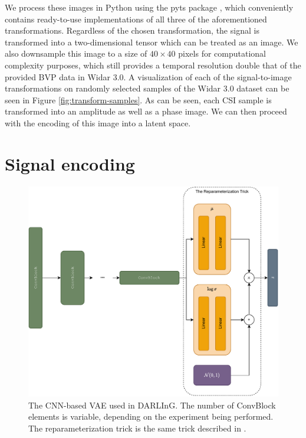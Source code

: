 We process these images in Python using the pyts package \cite{faouzi2020pyts}, which conveniently contains ready-to-use implementations of all three of the aforementioned transformations.
Regardless of the chosen transformation, the signal is transformed into a two-dimensional tensor which can be treated as an image.
We also downsample this image to a size of $40 \times 40$ pixels for computational complexity purposes, which still provides a temporal resolution double that of the provided BVP data in Widar 3.0.
A visualization of each of the signal-to-image transformations on randomly selected samples of the Widar 3.0 dataset can be seen in Figure \ref{fig:transform-samples}.
As can be seen, each CSI sample is transformed into an amplitude as well as a phase image.
We can then proceed with the encoding of this image into a latent space.

\section{Signal encoding}\label{sec:methodology-signal-encoding}

\begin{figure}
	\centering
	\includegraphics[width=\textwidth]{figures/vae-diagram}
	\caption{The CNN-based VAE used in DARLInG. The number of ConvBlock elements is variable, depending on the experiment being performed. The reparameterization trick is the same trick described in \cite{kingma2013auto}.}\label{fig:vae-diagram}
\end{figure}


